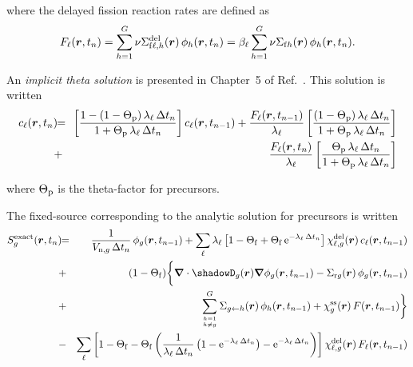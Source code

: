 \noindent where the delayed fission reaction rates are defined as
\begin{eqnarray}
F_\ell(\bff(r),t_{n})=\sum_{h=1}^G \nu\Sigma_{{\rm f}\ell,h}^{\rm del}(\bff(r)) \, \phi_h(\bff(r),t_n)=\beta_\ell \sum_{h=1}^G \nu\Sigma_{{\rm f}h}(\bff(r)) \, \phi_h(\bff(r),t_n) .
\label{eq:eq_inikin_4}
\end{eqnarray}

An {\sl implicit theta solution} is presented in Chapter~5 of Ref.~. This solution is written
\begin{eqnarray}
\nonumber c_{\ell}(\bff(r),t_n)\negthinspace\negthinspace&=&\negthinspace\negthinspace \left[ {1-(1- \Theta_{\rm p}) \, \lambda_\ell \, \Delta t_n \over 1+ \Theta_{\rm p}\, \lambda_\ell \, \Delta t_n }\right] c_{\ell}(\bff(r),t_{n-1}) +{F_\ell(\bff(r),t_{n-1})\over \lambda_\ell} \left[{(1- \Theta_{\rm p}) \, \lambda_\ell \, \Delta t_n\over 1+ \Theta_{\rm p}\, \lambda_\ell \, \Delta t_n } \right]  \\
&+&\negthinspace\negthinspace{F_\ell(\bff(r),t_n)\over \lambda_\ell}  \left[{ \Theta_{\rm p} \, \lambda_\ell \,\Delta t_n\over 1+ \Theta_{\rm p}\, \lambda_\ell \, \Delta t_n}  \right] 
\label{eq:eq_inikin_5}
\end{eqnarray}

\noindent where $\Theta_{\rm p}$ is the theta-factor for precursors.

The fixed-source corresponding to the analytic solution for precursors is written
\begin{eqnarray}
\nonumber S_g^{\rm exact}(\bff(r),t_n)\negthinspace\negthinspace&=&\negthinspace\negthinspace{1\over V_{{\rm n},g}\, \Delta t_n} \,\phi_g(\bff(r),t_{n-1}) + \sum_\ell\lambda_\ell \left[ 1- \Theta_{\rm f}+ \Theta_{\rm f} \, {\rm e}^{-\lambda_\ell \, \Delta t_n}\right]\chi_{\ell,g}^{\rm del}(\bff(r)) \, c_\ell(\bff(r),t_{n-1})\\
\nonumber &+& \negthinspace\negthinspace(1- \Theta_{\rm f})\bigg\{\bff(\nabla) \cdot \shadowD_g(\bff(r)) \bff(\nabla) \phi_g(\bff(r),t_{n-1}) - \Sigma_{{\rm r}g}(\bff(r)) \, \phi_g(\bff(r),t_{n-1}) \\
\nonumber&+&\negthinspace\negthinspace \sum_{{h=1} \atop {h \not= g}}^G \Sigma_{g \leftarrow h}(\bff(r)) \, \phi_h(\bff(r),t_{n-1})+\chi_g^{\rm ss}(\bff(r))\, F(\bff(r),t_{n-1})\bigg\} \\
&-& \negthinspace\negthinspace \sum_\ell \left[1- \Theta_{\rm f}- \Theta_{\rm f}  \left(
{1\over\lambda_\ell \, \Delta t_n}\left( 1- {\rm e}^{-\lambda_\ell \, \Delta t_n}\right)-{\rm e}^{-\lambda_\ell \, \Delta t_n} \right) \right] \chi_{\ell,g}^{\rm del}(\bff(r)) \, F_\ell(\bff(r),t_{n-1})
\label{eq:eq_inikin_6}
\end{eqnarray}

